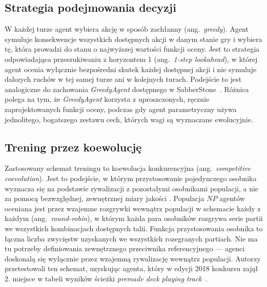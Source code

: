 \subsection{Strategia podejmowania decyzji}
W każdej turze agent wybiera akcję w sposób zachłanny (ang.~\textit{greedy}). Agent symuluje konsekwencje wszystkich dostępnych akcji w danym stanie gry i wybiera tę, która prowadzi do stanu o najwyższej wartości funkcji oceny. Jest to strategia odpowiadająca przeszukiwaniu z horyzontem 1 (ang.~\textit{1-step lookahead}), w której agent ocenia wyłącznie bezpośredni skutek każdej dostępnej akcji i nie symuluje dalszych ruchów w tej samej turze ani w kolejnych turach. Podejście to jest analogiczne do zachowania \textit{GreedyAgent} dostępnego w SabberStone~\cite{sanchez2020}. Różnica polega na tym, że \textit{GreedyAgent} korzysta z uproszczonych, ręcznie zaprojektowanych funkcji oceny, podczas gdy agent parametryczny używa jednolitego, bogatszego zestawu cech, których wagi są wyznaczane ewolucyjnie.

\subsection{Trening przez koewolucję}
Zastosowany schemat treningu to koewolucja konkurencyjna (ang.~\textit{competitive coevolution}). Jest to podejście, w którym przystosowanie pojedynczego osobnika wyznacza się na podstawie rywalizacji z pozostałymi osobnikami populacji, a nie za pomocą bezwzględnej, zewnętrznej miary jakości \cite{stanley2004}. Populacja $NP$ agentów oceniana jest przez wzajemne rozgrywki wewnątrz populacji w schemacie każdy z każdym (ang.~\textit{round-robin}), w którym każda para osobników rozgrywa serie partii we wszystkich kombinacjach dostępnych talii. Funkcja przystosowania osobnika to łączna liczba zwycięstw uzyskanych we wszystkich rozegranych partiach. Nie ma tu potrzeby definiowania zewnętrznego przeciwnika referencyjnego --- agenci doskonalą się wyłącznie przez wzajemną rywalizację wewnątrz populacji. Autorzy przetestowali ten schemat, uzyskując agenta, który w edycji 2018 konkursu zajął 2. miejsce w tabeli wyników ścieżki \textit{premade deck playing track}~\cite{sanchez2020}.

